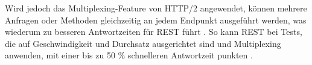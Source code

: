 \documentclass[draft,final]{vutinfth} %
\begin{document}
Wird jedoch das Multiplexing-Feature von HTTP/2 angewendet, können mehrere Anfragen oder Methoden gleichzeitig an jedem Endpunkt ausgeführt werden, was wiederum zu besseren Antwortzeiten für REST führt \cite{Lawi:2021:GraphVsRestPerformance}.
So kann REST bei Tests, die auf Geschwindigkeit und Durchsatz ausgerichtet sind und Multiplexing anwenden, mit einer bis zu 50 \% schnelleren Antwortzeit punkten \cite{Lawi:2021:GraphVsRestPerformance}.



%
%
%
%
%
\end{document}
